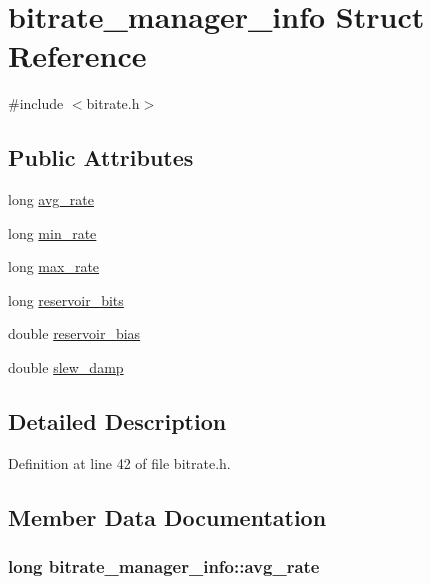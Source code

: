 \hypertarget{structbitrate__manager__info}{}\section{bitrate\+\_\+manager\+\_\+info Struct Reference}
\label{structbitrate__manager__info}


{\ttfamily \#include $<$bitrate.\+h$>$}

\subsection*{Public Attributes}
\begin{DoxyCompactItemize}
\item 
long \hyperlink{structbitrate__manager__info_a641dc9820b98f174f73cd36b2769127c}{avg\+\_\+rate}
\item 
long \hyperlink{structbitrate__manager__info_a70b89ca96ddf87dc93eac879429c0d5d}{min\+\_\+rate}
\item 
long \hyperlink{structbitrate__manager__info_a8694ec6266069b0e3521793ecd4e59d2}{max\+\_\+rate}
\item 
long \hyperlink{structbitrate__manager__info_ac3474e0e648e661ac5e4b0d8a434fa32}{reservoir\+\_\+bits}
\item 
double \hyperlink{structbitrate__manager__info_a7e3ab7c2b92ee477615a6308952f3005}{reservoir\+\_\+bias}
\item 
double \hyperlink{structbitrate__manager__info_a8b2831842978c4a426f63241ec17d030}{slew\+\_\+damp}
\end{DoxyCompactItemize}


\subsection{Detailed Description}


Definition at line 42 of file bitrate.\+h.



\subsection{Member Data Documentation}
\subsubsection[{\texorpdfstring{avg\+\_\+rate}{avg_rate}}]{\setlength{\rightskip}{0pt plus 5cm}long bitrate\+\_\+manager\+\_\+info\+::avg\+\_\+rate}\hypertarget{structbitrate__manager__info_a641dc9820b98f174f73cd36b2769127c}{}\label{structbitrate__manager__info_a641dc9820b98f174f73cd36b2769127c}


